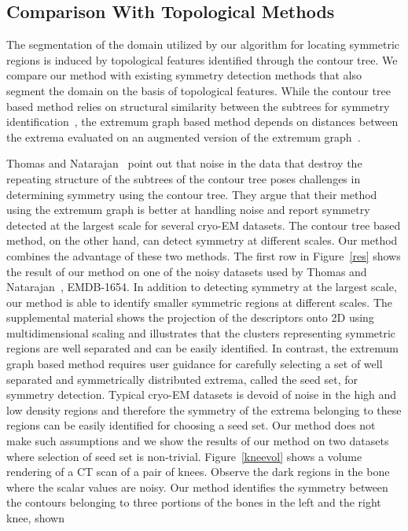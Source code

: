 \documentclass[review,journal]{vgtc}         %
\begin{document}
\subsection{Comparison With Topological Methods}
The segmentation of the domain utilized by our algorithm for locating symmetric regions is
induced by topological features identified through the contour tree. We compare our
method with existing symmetry detection methods that also segment the domain on the
basis of topological features. While the contour tree based method relies 
on structural similarity between the subtrees for symmetry identification~\cite{ThomN11}, the extremum graph
based method depends on distances between the extrema evaluated on an augmented version of the extremum
graph~\cite{ThomN13}. 

Thomas and Natarajan~\cite{ThomN13} point out that noise in the data
that destroy the repeating structure of the subtrees of the contour tree poses challenges in
determining symmetry using the contour tree. They argue that their method using the extremum graph
is better at handling noise and report symmetry detected at the largest scale for several 
cryo-EM datasets. The contour tree based method, on the other hand, can detect symmetry at different scales.
Our method combines the advantage of these two methods. The first row in Figure~\ref{res} shows the result of our
method on one of the noisy datasets used by Thomas and Natarajan~\cite{ThomN13}, EMDB-1654. In addition 
to detecting symmetry at the largest scale, our method is able to identify smaller symmetric
regions at different scales. The supplemental
material shows the projection of the descriptors onto 2D using multidimensional scaling and
illustrates that the clusters representing symmetric regions are well separated and can be easily identified. 
In contrast,
the extremum graph based method requires user guidance for carefully
selecting a set of well separated and symmetrically distributed extrema, called the seed set, 
for symmetry detection. Typical cryo-EM datasets is devoid of noise in the high and low density regions and therefore
the symmetry of the extrema belonging to these regions can be easily identified for choosing
a seed set. Our method does not make such assumptions and we show the results of our method 
on two datasets where selection of seed
set is non-trivial. Figure~\ref{kneevol} shows a volume rendering of a CT scan of a pair of knees. Observe the
dark regions in the bone where the scalar values are noisy. Our method identifies
the symmetry between the contours belonging to three portions of the bones in the left and the right knee, shown
\end{document}
